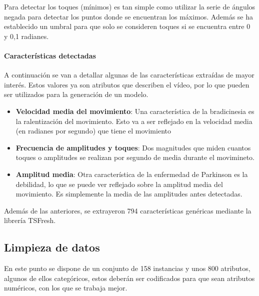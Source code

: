 
Para detectar los toques (mínimos) es tan simple como utilizar la serie de
ángulos negada para detectar los puntos donde se encuentran los máximos. Además
se ha establecido un umbral para que solo se consideren toques si se encuentra
entre 0 y 0,1 radianes.


\paragraph{Características detectadas}

A continuación se van a detallar algunas de las características extraídas de
mayor interés. Estos valores ya son atributos que describen el vídeo, por lo que
pueden ser utilizados para la generación de un modelo.

\begin{itemize}
    \item \textbf{Velocidad media del movimiento}: Una característica de la
    bradicinesia es la ralentización del movimiento. Esto va a ser reflejado en
    la velocidad media (en radianes por segundo) que tiene el movimiento
    \item \textbf{Frecuencia de amplitudes y toques}: Dos magnitudes que miden
    cuantos toques o amplitudes se realizan por segundo de media durante el
    movimineto.
    \item \textbf{Amplitud media}: Otra característica de la enfermedad de
    Parkinson es la debilidad, lo que se puede ver reflejado sobre la amplitud
    media del movimiento. Es simplemente la media de las amplitudes antes
    detectadas.
\end{itemize}

Además de las anteriores, se extrayeron 794 características genéricas
mediante la librería TSFresh.

\subsection{Limpieza de datos}

En este punto se dispone de un conjunto de 158 instancias y unos 800 atributos,
algunos de ellos categóricos, estos deberán ser codificados para que sean
atributos numéricos, con los que se trabaja mejor.

